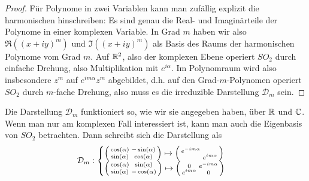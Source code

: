 \begin{proof}
Für Polynome in zwei Variablen kann man zufällig explizit die harmonischen hinschreiben: Es sind genau die Real- und Imaginärteile der Polynome in einer komplexen Variable. In Grad $m$ haben wir also $\Re((x+iy)^m)$ und $\Im((x+iy)^m)$ als Basis des Raums der harmonischen Polynome vom Grad $m$. Auf $\mathbb{R}^2$, also der komplexen Ebene operiert $SO_2$ durch einfache Drehung, also Multiplikation mit $e^{i\alpha}$. Im Polynomraum wird also insbesondere $z^m$ auf $e^{im\alpha}z^m$ abgebildet, d.h. auf den Grad-$m$-Polynomen operiert $SO_2$ durch $m$-fache Drehung, also muss es die irreduzible Darstellung $\mathcal{D}_m$ sein.
\end{proof}

\begin{remark}
Die Darstellung $\mathcal{D}_m$ funktioniert so, wie wir sie angegeben haben, über $\mathbb{R}$ und $\mathbb{C}$. Wenn man nur am komplexen Fall interessiert ist, kann man auch die Eigenbasis von $SO_2$ betrachten. Dann schreibt sich die Darstellung als
\[\mathcal{D}_m : \begin{cases}
\begin{psmallmatrix}\cos(\alpha)&-\sin(\alpha)\\\sin(\alpha)&\cos(\alpha)\end{psmallmatrix} \mapsto \begin{psmallmatrix}e^{-im\alpha} & \\ & e^{im\alpha} \end{psmallmatrix} \\
\begin{psmallmatrix}\cos(\alpha)&\sin(\alpha)\\\sin(\alpha)&-\cos(\alpha)\end{psmallmatrix} \mapsto \begin{psmallmatrix}0 & e^{-im\alpha} \\ e^{im\alpha} & 0\end{psmallmatrix}
\end{cases}\]
\end{remark}